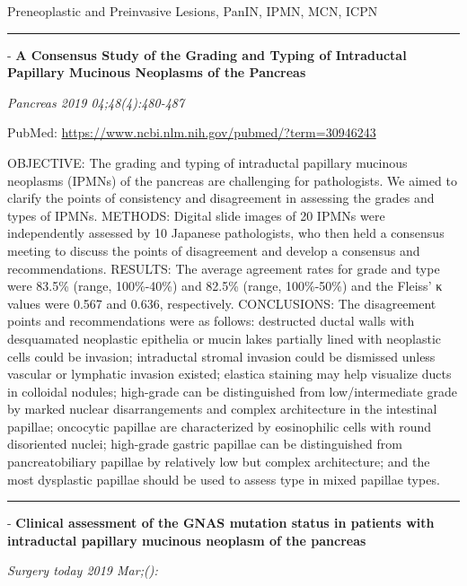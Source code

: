 \documentclass[]{article}
\begin{document}
Preneoplastic and Preinvasive Lesions, PanIN, IPMN, MCN, ICPN

\begin{center}\rule{0.5\linewidth}{\linethickness}\end{center}

 - \textbf{A Consensus Study of the Grading and Typing of Intraductal
Papillary Mucinous Neoplasms of the Pancreas}

\emph{Pancreas 2019 04;48(4):480-487}

PubMed: \url{https://www.ncbi.nlm.nih.gov/pubmed/?term=30946243}

OBJECTIVE: The grading and typing of intraductal papillary mucinous
neoplasms (IPMNs) of the pancreas are challenging for pathologists. We
aimed to clarify the points of consistency and disagreement in assessing
the grades and types of IPMNs. METHODS: Digital slide images of 20 IPMNs
were independently assessed by 10 Japanese pathologists, who then held a
consensus meeting to discuss the points of disagreement and develop a
consensus and recommendations. RESULTS: The average agreement rates for
grade and type were 83.5\% (range, 100\%-40\%) and 82.5\% (range,
100\%-50\%) and the Fleiss' κ values were 0.567 and 0.636, respectively.
CONCLUSIONS: The disagreement points and recommendations were as
follows: destructed ductal walls with desquamated neoplastic epithelia
or mucin lakes partially lined with neoplastic cells could be invasion;
intraductal stromal invasion could be dismissed unless vascular or
lymphatic invasion existed; elastica staining may help visualize ducts
in colloidal nodules; high-grade can be distinguished from
low/intermediate grade by marked nuclear disarrangements and complex
architecture in the intestinal papillae; oncocytic papillae are
characterized by eosinophilic cells with round disoriented nuclei;
high-grade gastric papillae can be distinguished from pancreatobiliary
papillae by relatively low but complex architecture; and the most
dysplastic papillae should be used to assess type in mixed papillae
types.

{}

{}

\begin{center}\rule{0.5\linewidth}{\linethickness}\end{center}

 - \textbf{Clinical assessment of the GNAS mutation status in patients
with intraductal papillary mucinous neoplasm of the pancreas}

\emph{Surgery today 2019 Mar;():}
\end{document}
